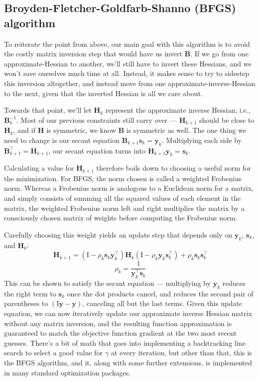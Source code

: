 \documentclass[12pt]{article}
\begin{document}
\subsection{Broyden-Fletcher-Goldfarb-Shanno (BFGS) algorithm}

To reiterate the point from above, our main goal with this algorithm is to avoid the costly matrix inversion step that would have us 
invert \(\mathbf{B}\). If we go from one approximate-Hessian to another, we'll still have to invert these Hessians, and we won't save 
ourselves much time at all. Instead, it makes sense to try to sidestep this inversion altogether, and instead move from one
approximate-inverse-Hessian to the next, given that the inverted Hessian is all we care about. 

Towards that point, we'll let \(\mathbf{H}_k\) represent the approximate inverse Hessian; i.e., \(\mathbf{B}_{k}^{-1}\). Most of our previous 
constraints still carry over --- \(\mathbf{H}_{k+1}\) should be close to \(\mathbf{H}_k\), and if \(\mathbf{H}\) is 
symmetric, we know \(\mathbf{B}\) is symmetric as well. The one thing we need to change is our secant equation 
\(\mathbf{B}_{k+1} \mathbf{s}_k = \mathbf{y}_k\). Multiplying each side by \(\mathbf{B}_{k+1}^\top = \mathbf{H}_{k+1}\), our secant equation turns
into \(\mathbf{H}_{k+1} \mathbf{y}_k = \mathbf{s}_k\).

Calculating a value for \(\mathbf{H}_{k+1}\) therefore boils down to choosing a useful norm for the minimization. For BFGS,
the norm chosen is called a weighted Frobenius norm. Whereas a Frobenius norm is analogous to a Euclidean norm for a matrix, and
simply consists of summing all the squared values of each element in the matrix, the weighted Frobenius norm 
left and right multiplies the matrix by a consciously chosen matrix of weights before computing the Frobenius norm.

Carefully choosing this weight yields an update step that depends only on \(\mathbf{y}_k\), \(\mathbf{s}_k\), and \(\mathbf{H}_k\):
\[\mathbf{H}_{k+1} = (\mathrm{I} - \rho_k \mathbf{s}_k \mathbf{y}_k^\top)\mathbf{H}_k(\mathrm{I} - \rho_k \mathbf{y}_k \mathbf{s}_k^\top) + \rho_k \mathbf{s}_k \mathbf{s}_k^\top\]
\[\rho_k = \frac{1}{\mathbf{y}_k^\top \mathbf{s}_k}\]
This can be shown to satisfy the secant equation --- multiplying by \(\mathbf{y}_k\) reduces the right term to \(\mathbf{s}_k\)
once the dot products cancel, and reduces the second pair of parentheses to \((\mathrm{I}\mathbf{y} - \mathbf{y})\), canceling all but the 
last terms. Given this update equation, we can now iteratively update our approximate inverse Hessian matrix without any
matrix inversion, and the resulting function approximation is guaranteed to match the objective function gradient at the two most recent
guesses. There's a bit of math that goes into implementing a backtracking line search to select a good value for 
\(\gamma\) at every iteration, but other than that, this is the BFGS algorithm, and it, along with some further extensions, is 
implemented in many standard optimization packages. 
\end{document}

